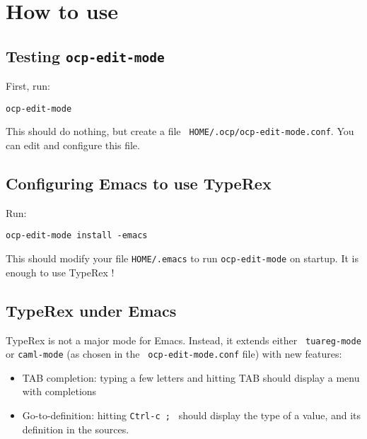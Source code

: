 

\section{How to use}

\subsection{Testing {\tt ocp-edit-mode}}

First, run:
\begin{verbatim}
ocp-edit-mode
\end{verbatim}

This should do nothing, but create a file {\tt
  HOME/.ocp/ocp-edit-mode.conf}. You can edit and configure this file.

\subsection{Configuring Emacs to use TypeRex}

Run:
\begin{verbatim}
ocp-edit-mode install -emacs
\end{verbatim}

This should modify your file {\tt HOME/.emacs} to run {\tt ocp-edit-mode}
on startup. It is enough to use TypeRex !

\subsection{TypeRex under Emacs}

TypeRex is not a major mode for Emacs. Instead, it extends either {\tt
  tuareg-mode} or {\tt caml-mode} (as chosen in the {\tt
  ocp-edit-mode.conf} file) with new features:

\begin{itemize}
\item TAB completion: typing a few letters and hitting TAB should
  display a menu with completions
\item Go-to-definition: hitting {\tt Ctrl-c ; } should display the
  type of a value, and its definition in the sources.
\end{itemize}
